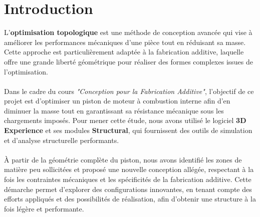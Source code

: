 \documentclass{rapportECL}
\begin{document}






        
\fairemarges %
\fairepagedegarde %
\tabledematieres %


\section{Introduction}

L'\textbf{optimisation topologique} est une méthode de conception avancée qui vise à améliorer les performances mécaniques d'une pièce tout en réduisant sa masse. Cette approche est particulièrement adaptée à la fabrication additive, laquelle offre une grande liberté géométrique pour réaliser des formes complexes issues de l'optimisation.
\\\\
Dans le cadre du cours\textit{ "Conception pour la Fabrication Additive"}, l'objectif de ce projet est d'optimiser un piston de moteur à combustion interne afin d'en diminuer la masse tout en garantissant sa résistance mécanique sous les chargements imposés. Pour mener cette étude, nous avons utilisé le logiciel \textbf{3D Experience} et ses modules \textbf{Structural}, qui fournissent des outils de simulation et d'analyse structurelle performants.
\\\\
À partir de la géométrie complète du piston, nous avons identifié les zones de matière peu sollicitées et proposé une nouvelle conception allégée, respectant à la fois les contraintes mécaniques et les spécificités de la fabrication additive. Cette démarche permet d'explorer des configurations innovantes, en tenant compte des efforts appliqués et des possibilités de réalisation, afin d'obtenir une structure à la fois légère et performante.
\end{document}
